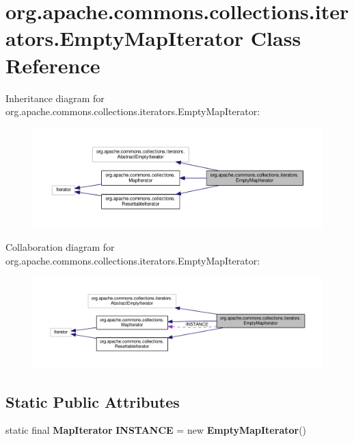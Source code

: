 \section{org.\-apache.\-commons.\-collections.\-iterators.\-Empty\-Map\-Iterator Class Reference}
\label{classorg_1_1apache_1_1commons_1_1collections_1_1iterators_1_1_empty_map_iterator}


Inheritance diagram for org.\-apache.\-commons.\-collections.\-iterators.\-Empty\-Map\-Iterator\-:
\nopagebreak
\begin{figure}[H]
\begin{center}
\leavevmode
\includegraphics[width=350pt]{classorg_1_1apache_1_1commons_1_1collections_1_1iterators_1_1_empty_map_iterator__inherit__graph}
\end{center}
\end{figure}


Collaboration diagram for org.\-apache.\-commons.\-collections.\-iterators.\-Empty\-Map\-Iterator\-:
\nopagebreak
\begin{figure}[H]
\begin{center}
\leavevmode
\includegraphics[width=350pt]{classorg_1_1apache_1_1commons_1_1collections_1_1iterators_1_1_empty_map_iterator__coll__graph}
\end{center}
\end{figure}
\subsection*{Static Public Attributes}
\begin{DoxyCompactItemize}
\item 
static final {\bf Map\-Iterator} {\bf I\-N\-S\-T\-A\-N\-C\-E} = new {\bf Empty\-Map\-Iterator}()
\end{DoxyCompactItemize}
